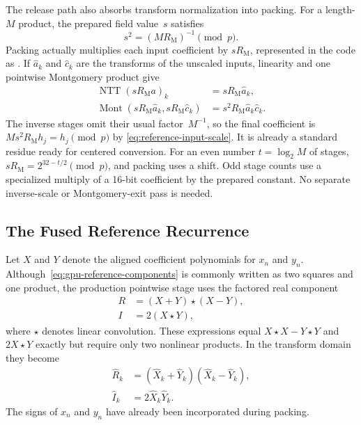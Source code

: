 The release path also absorbs transform normalization into packing.  For a
length-$M$ product, the prepared field value~$s$ satisfies
\begin{equation}
  s^2=(MR_{\mathrm M})^{-1}\pmod p.
  \label{eq:reference-input-scale}
\end{equation}
Packing actually multiplies each input coefficient by $sR_{\mathrm M}$,
represented in the code as .  If $\widehat a_k$ and
$\widehat c_k$ are the transforms of the unscaled inputs, linearity and one
pointwise Montgomery product give
\begin{align}
  \operatorname{NTT}(sR_{\mathrm M}a)_k
    &=sR_{\mathrm M}\widehat a_k, \\
  \operatorname{Mont}(sR_{\mathrm M}\widehat a_k,
                      sR_{\mathrm M}\widehat c_k)
    &=s^2R_{\mathrm M}\widehat a_k\widehat c_k.
\end{align}
The inverse stages omit their usual factor~$M^{-1}$, so the final coefficient
is $Ms^2R_{\mathrm M}h_j=h_j\pmod p$ by
\eqref{eq:reference-input-scale}.  It is already a standard residue ready for
centered conversion.  For an even number $t=\log_2M$ of stages,
$sR_{\mathrm M}=2^{32-t/2}\pmod p$, and packing uses a shift.  Odd stage
counts use a specialized multiply of a 16-bit coefficient by the prepared
constant.  No separate inverse-scale or Montgomery-exit pass is needed.

\subsection{The Fused Reference Recurrence}
\label{subsec:fused-ntt-reference-step}

Let $X$ and $Y$ denote the aligned coefficient polynomials for $x_n$ and
$y_n$.  Although~\eqref{eq:gpu-reference-components} is commonly written as
two squares and one product, the production pointwise stage uses the factored
real component
\begin{align}
  R &= (X+Y)\star(X-Y),
       \label{eq:fused-reference-real} \\
  I &= 2(X\star Y),
       \label{eq:fused-reference-imag}
\end{align}
where $\star$ denotes linear convolution.  These expressions equal
$X\star X-Y\star Y$ and $2X\star Y$ exactly but require only two nonlinear
products.  In the transform domain they become
\begin{align}
  \widehat R_k &= (\widehat X_k+\widehat Y_k)
                  (\widehat X_k-\widehat Y_k), \\
  \widehat I_k &= 2\widehat X_k\widehat Y_k.
  \label{eq:fused-reference-pointwise}
\end{align}
The signs of $x_n$ and $y_n$ have already been incorporated during packing.

